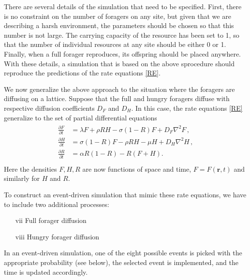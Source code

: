 \documentclass[11pt]{iopart}
\begin{document}
There are several details of the simulation that need to be specified.
First, there is no constraint on the number of foragers on any site, but
given that we are describing a harsh environment, the parameters should be
chosen so that this number is not large.  The carrying capacity of the
resource has been set to 1, so that the number of individual resources at any
site should be either 0 or 1.  Finally, when a full forager reproduces, its
offspring should be placed anywhere.  With these details, a simulation that
is based on the above sprocedure should reproduce the predictions of the rate
equations \eqref{RE}.


We now generalize the above approach to the situation where the foragers are
diffusing on a lattice.  Suppose that the full and hungry foragers diffuse
with respective diffusion coefficients $D_F$ and $D_H$.  In this case, the
rate equations \eqref{RE} generalize to the set of partial differential
equations
\begin{align}
  \label{pde}
\begin{split}
\frac{\partial F}{\partial t} &= \lambda F + \rho  RH - \sigma (1-R)F+D_F\nabla^2F\,,\\[0.125in]
\frac{\partial H}{\partial t}  &= \sigma (1-R)F - \rho RH - \mu H+D_H\nabla^2H\,, \\[0.125in]
\frac{\partial R}{\partial t}  &= \alpha R(1-R) -  R(F+H).\\
\end{split}
\end{align}
Here the densities $F,H,R$ are now functions of space and time,
$F=F(\mathbf{r},t)$ and similarly for $H$ and $R$.

To construct an event-driven simulation that mimic these rate equations, we
have to include two additional processes:
\begin{enumerate}
\item[vii] Full forager diffusion
\item[viii] Hungry forager diffusion
\end{enumerate}
In an event-driven simulation, one of the eight possible events is picked
with the appropriate probability (see below), the selected event is
implemented, and the time is updated accordingly.
\end{document}
